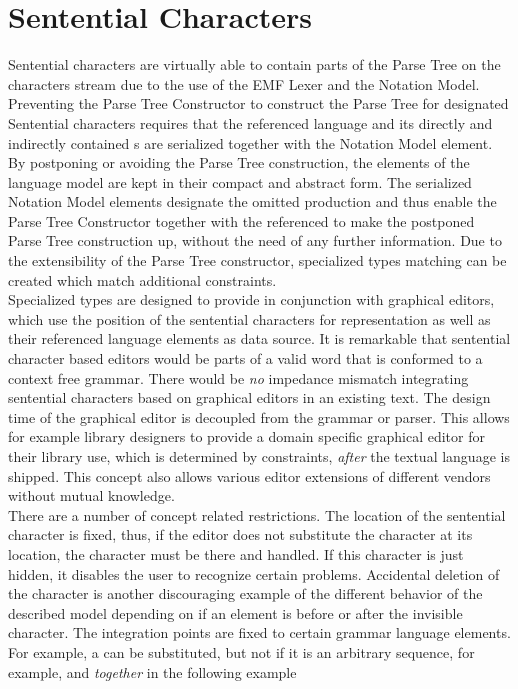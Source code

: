 \section{Sentential Characters}
Sentential characters are virtually able to contain parts of the Parse Tree on the characters stream due to the use of the EMF Lexer and the Notation Model. Preventing the Parse Tree Constructor to construct the Parse Tree for designated Sentential characters requires that the referenced language  and its directly and indirectly contained s are serialized together with the Notation Model element. By postponing or avoiding the Parse Tree construction, the elements of the language model are kept in their compact and abstract form. The serialized Notation Model elements designate the omitted production and thus enable the Parse Tree Constructor together with the referenced  to make the postponed Parse Tree construction up, without the need of any further information. Due to the extensibility of the Parse Tree constructor, specialized types matching can be created which match additional constraints.  \\
Specialized types are designed to provide in conjunction with graphical editors, which use the position of the sentential characters for representation as well as their referenced language elements as data source. It is remarkable that sentential character based editors would be parts of a valid word that is conformed to a context free grammar. There would be \emph{no} impedance mismatch integrating sentential characters based on graphical editors in an existing text. The design time of the graphical editor is decoupled from the grammar or parser. This allows for example library designers to provide a domain specific graphical editor for their library use, which is determined by constraints, \emph{after} the textual language is shipped. This concept also allows various editor extensions of different vendors without mutual knowledge.\\
There are a number of concept related restrictions. The location of the sentential character is fixed, thus, if the editor does not substitute the character at its location, the character must be there and handled. If this character is just hidden, it disables the user to recognize certain problems. Accidental deletion of the character is another discouraging example of the different behavior of the described model depending on if an element is before or after the invisible character. The integration points are fixed to certain grammar language elements. For example, a  can be substituted, but not if it is an arbitrary sequence, for example,  and  \emph{together} in the following example\\
